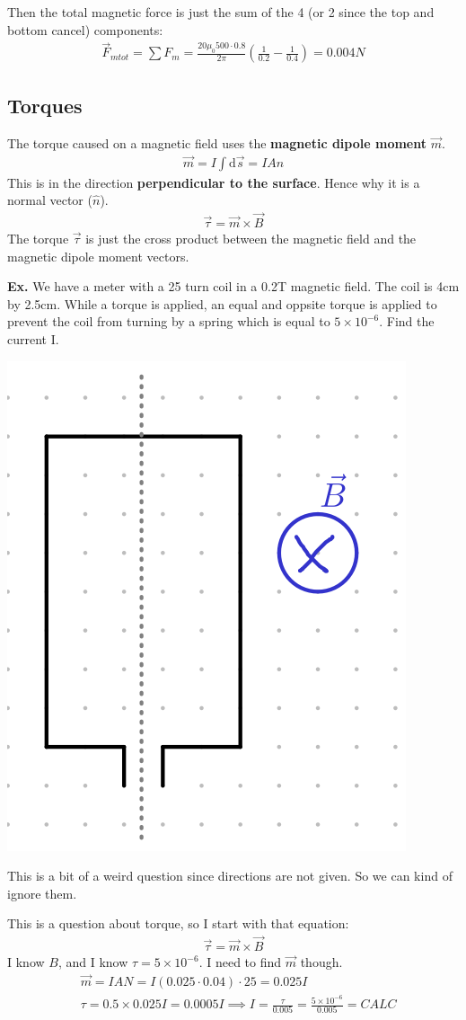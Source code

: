\documentclass[12pt,letterpaper]{article} \usepackage{amsmath} \usepackage{graphicx} \usepackage[margin=1in]{geometry} \usepackage{longtable}  \usepackage{amssymb}
\begin{document}
\begin{mdframed}
		Then the total magnetic force is just the sum of the 4 (or 2 since the top and bottom cancel) components:
		\begin{align*}
			\vec F_{mtot} = \sum F_m = \frac{20\mu_0 500\cdot 0.8}{2\pi}\left(\frac{1}{0.2}-\frac{1}{0.4}\right) = 0.004N
		\end{align*}
	\end{mdframed}
	
	\subsection{Torques}
	The torque caused on a magnetic field uses the \textbf{magnetic dipole moment} $\vec m$.
	\begin{align*}
		\vec m = I\int \mathrm d \vec s = IA\hat n
	\end{align*}
	This is in the direction \textbf{perpendicular to the surface}. Hence why it is a normal vector ($\hat n$).
	\begin{align*}
		\vec \tau = \vec m \times \vec B
	\end{align*}
	The torque $\vec \tau$ is just the cross product between the magnetic field and the magnetic dipole moment vectors.
	
	\begin{mdframed}
		\textbf{Ex. }We have a meter with a 25 turn coil in a 0.2T magnetic field. The coil is 4cm by 2.5cm. While a torque is applied, an equal and oppsite torque is applied to prevent the coil from turning by a spring which is equal to $5\times 10^{-6}$. Find the current I.
		\begin{center}
			\includegraphics[width=0.3\linewidth]{torque-ex}
		\end{center}
		This is a bit of a weird question since directions are not given. So we can kind of ignore them.
		
		This is a question about torque, so I start with that equation:
		\begin{align*}
			\vec \tau = \vec m \times \vec B
		\end{align*}
		I know $B$, and I know $\tau = 5\times 10^{-6}$. I need to find $\vec m$ though. 
		\begin{align*}
			&\vec m = IAN = I(0.025\cdot 0.04)\cdot 25 = 0.025I\\
			&\tau = 0.5\times 0.025I = 0.0005I \implies I = \frac{\tau}{0.005} = \frac{5\times 10^{-6}}{0.005} = CALC
		\end{align*}
		
	\end{mdframed}
	
\end{document}
